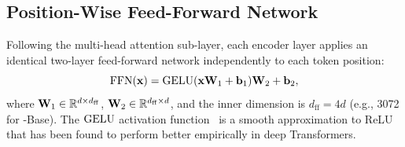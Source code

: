\subsection{Position-Wise Feed-Forward Network}
\label{subsec:ffn}

Following the multi-head attention sub-layer, each encoder layer applies an
identical two-layer feed-forward network independently to each token position:
\begin{equation}
  \operatorname{FFN}(\mathbf{x})
  = \operatorname{GELU}(\mathbf{x}\mathbf{W}_1 + \mathbf{b}_1)\mathbf{W}_2 + \mathbf{b}_2,
  \label{eq:ffn}
\end{equation}
where $\mathbf{W}_1 \in \mathbb{R}^{d \times d_{\mathrm{ff}}}$,
$\mathbf{W}_2 \in \mathbb{R}^{d_{\mathrm{ff}} \times d}$, and the inner dimension is
$d_{\mathrm{ff}} = 4d$ (e.g., 3072 for \bert{}-Base).  The $\operatorname{GELU}$ activation
function~\cite{hendrycks2016gelu} is a smooth approximation to ReLU that has been
found to perform better empirically in deep Transformers.
